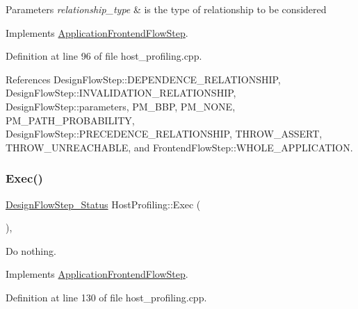 \begin{DoxyParams}{Parameters}
{\em relationship\+\_\+type} & is the type of relationship to be considered \\
\hline
\end{DoxyParams}


Implements \hyperlink{classApplicationFrontendFlowStep_ab308200c0096ccff3a1ff50e864ed61f}{Application\+Frontend\+Flow\+Step}.



Definition at line 96 of file host\+\_\+profiling.\+cpp.



References Design\+Flow\+Step\+::\+D\+E\+P\+E\+N\+D\+E\+N\+C\+E\+\_\+\+R\+E\+L\+A\+T\+I\+O\+N\+S\+H\+IP, Design\+Flow\+Step\+::\+I\+N\+V\+A\+L\+I\+D\+A\+T\+I\+O\+N\+\_\+\+R\+E\+L\+A\+T\+I\+O\+N\+S\+H\+IP, Design\+Flow\+Step\+::parameters, P\+M\+\_\+\+B\+BP, P\+M\+\_\+\+N\+O\+NE, P\+M\+\_\+\+P\+A\+T\+H\+\_\+\+P\+R\+O\+B\+A\+B\+I\+L\+I\+TY, Design\+Flow\+Step\+::\+P\+R\+E\+C\+E\+D\+E\+N\+C\+E\+\_\+\+R\+E\+L\+A\+T\+I\+O\+N\+S\+H\+IP, T\+H\+R\+O\+W\+\_\+\+A\+S\+S\+E\+RT, T\+H\+R\+O\+W\+\_\+\+U\+N\+R\+E\+A\+C\+H\+A\+B\+LE, and Frontend\+Flow\+Step\+::\+W\+H\+O\+L\+E\+\_\+\+A\+P\+P\+L\+I\+C\+A\+T\+I\+ON.

\mbox{\label{classHostProfiling_a9cf2a3820514e3a207c5e975a25f7d04}} 
\subsubsection{\texorpdfstring{Exec()}{Exec()}}
{\footnotesize\ttfamily \hyperlink{design__flow__step_8hpp_afb1f0d73069c26076b8d31dbc8ebecdf}{Design\+Flow\+Step\+\_\+\+Status} Host\+Profiling\+::\+Exec (\begin{DoxyParamCaption}{ }\end{DoxyParamCaption})\hspace{0.3cm}{\ttfamily [override]}, {\ttfamily [virtual]}}



Do nothing. 



Implements \hyperlink{classApplicationFrontendFlowStep_a2bf060a5ebc1735635dc5c7773387a25}{Application\+Frontend\+Flow\+Step}.



Definition at line 130 of file host\+\_\+profiling.\+cpp.



